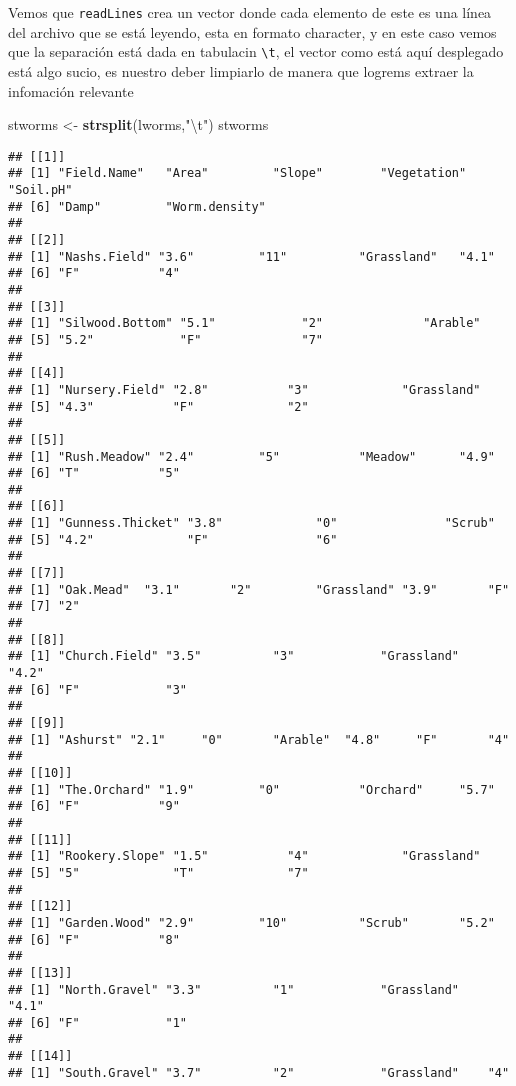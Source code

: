 \documentclass[]{article}
\newenvironment{Shaded}{\begin{snugshade}}{\end{snugshade}}
\newcommand{\KeywordTok}[1]{\textcolor[rgb]{0.13,0.29,0.53}{\textbf{#1}}}
\newcommand{\CharTok}[1]{\textcolor[rgb]{0.31,0.60,0.02}{#1}}
\newcommand{\StringTok}[1]{\textcolor[rgb]{0.31,0.60,0.02}{#1}}
\newcommand{\NormalTok}[1]{#1}
\begin{document}
Vemos que \texttt{readLines} crea un vector donde cada elemento de este
es una línea del archivo que se está leyendo, esta en formato character,
y en este caso vemos que la separación está dada en tabulacin
\texttt{\textbackslash{}t}, el vector como está aquí desplegado está
algo sucio, es nuestro deber limpiarlo de manera que logrems extraer la
infomación relevante

\begin{Shaded}
\begin{Highlighting}[]
\NormalTok{stworms <-}\StringTok{ }\KeywordTok{strsplit}\NormalTok{(lworms,}\StringTok{"}\CharTok{\textbackslash{}t}\StringTok{"}\NormalTok{)}
\NormalTok{stworms}
\end{Highlighting}
\end{Shaded}

\begin{verbatim}
## [[1]]
## [1] "Field.Name"   "Area"         "Slope"        "Vegetation"   "Soil.pH"     
## [6] "Damp"         "Worm.density"
## 
## [[2]]
## [1] "Nashs.Field" "3.6"         "11"          "Grassland"   "4.1"        
## [6] "F"           "4"          
## 
## [[3]]
## [1] "Silwood.Bottom" "5.1"            "2"              "Arable"        
## [5] "5.2"            "F"              "7"             
## 
## [[4]]
## [1] "Nursery.Field" "2.8"           "3"             "Grassland"    
## [5] "4.3"           "F"             "2"            
## 
## [[5]]
## [1] "Rush.Meadow" "2.4"         "5"           "Meadow"      "4.9"        
## [6] "T"           "5"          
## 
## [[6]]
## [1] "Gunness.Thicket" "3.8"             "0"               "Scrub"          
## [5] "4.2"             "F"               "6"              
## 
## [[7]]
## [1] "Oak.Mead"  "3.1"       "2"         "Grassland" "3.9"       "F"        
## [7] "2"        
## 
## [[8]]
## [1] "Church.Field" "3.5"          "3"            "Grassland"    "4.2"         
## [6] "F"            "3"           
## 
## [[9]]
## [1] "Ashurst" "2.1"     "0"       "Arable"  "4.8"     "F"       "4"      
## 
## [[10]]
## [1] "The.Orchard" "1.9"         "0"           "Orchard"     "5.7"        
## [6] "F"           "9"          
## 
## [[11]]
## [1] "Rookery.Slope" "1.5"           "4"             "Grassland"    
## [5] "5"             "T"             "7"            
## 
## [[12]]
## [1] "Garden.Wood" "2.9"         "10"          "Scrub"       "5.2"        
## [6] "F"           "8"          
## 
## [[13]]
## [1] "North.Gravel" "3.3"          "1"            "Grassland"    "4.1"         
## [6] "F"            "1"           
## 
## [[14]]
## [1] "South.Gravel" "3.7"          "2"            "Grassland"    "4"           

\end{verbatim}
\end{document}
